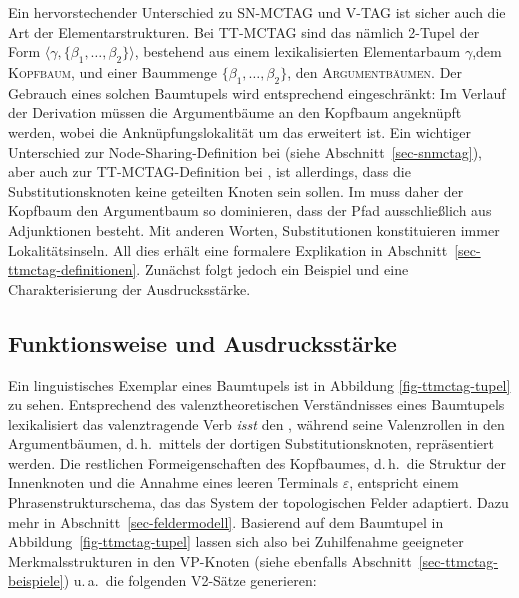 Ein hervorstechender Unterschied zu SN-MCTAG und V-TAG ist sicher auch die Art der Elementarstrukturen. Bei TT-MCTAG sind das nämlich 2-Tupel der Form $\langle \gamma, \{\beta_1,\ldots,\beta_2\}\rangle$, bestehend aus einem lexikalisierten Elementarbaum $\gamma$,\linebreak dem \textsc{Kopfbaum}, und einer Baummenge $\{\beta_1,\ldots,\beta_2\}$, den \textsc{Argumentbäumen}. Der Gebrauch eines solchen Baumtupels wird entsprechend eingeschränkt: Im Verlauf der Derivation müssen die Argumentbäume an den Kopfbaum angeknüpft werden, wobei die Anknüpfungslokalität um das  erweitert ist. Ein wichtiger Unterschied zur Node-Sharing-Definition bei \cite{Kallmeyer:05} (siehe Abschnitt~\ref{sec-snmctag}), aber auch zur TT-MCTAG-Definition bei \cite{Kallmeyer:09}, ist allerdings, dass die Substitutionsknoten keine geteilten Knoten sein sollen. Im  muss daher der Kopfbaum den Argumentbaum so dominieren, dass der Pfad ausschlie\ss lich aus Adjunktionen besteht. Mit anderen Worten, Substitutionen konstituieren immer Lokalitätsinseln. All dies erhält eine formalere Explikation in Abschnitt~\ref{sec-ttmctag-definitionen}. Zunächst folgt jedoch ein Beispiel und eine Charakterisierung der Ausdrucksstärke.  

\subsection{Funktionsweise und Ausdrucksstärke} \label{sec-ttmctag-funktionausdruck}

Ein linguistisches Exemplar eines Baumtupels ist in Abbildung \ref{fig-ttmctag-tupel} zu sehen. Entsprechend des valenztheoretischen Verständnisses eines Baumtupels lexikalisiert das valenztragende Verb {\it isst} den , während seine Valenzrollen in den Argumentbäumen, d.\,h.\ mittels der dortigen Substitutionsknoten, repräsentiert werden. Die restlichen Formeigenschaften des Kopfbaumes, d.\,h.\ die Struktur der Innenknoten und die Annahme eines leeren Terminals $\varepsilon$,  entspricht einem Phrasenstrukturschema, das das System der topologischen Felder adaptiert. Dazu mehr in Abschnitt~\ref{sec-feldermodell}. Basierend auf dem Baumtupel in Abbildung~\ref{fig-ttmctag-tupel} lassen sich also bei Zuhilfenahme geeigneter Merkmalsstrukturen in den VP-Knoten (siehe ebenfalls Abschnitt~\ref{sec-ttmctag-beispiele}) u.\,a.\ die folgenden V2-Sätze generieren:  

